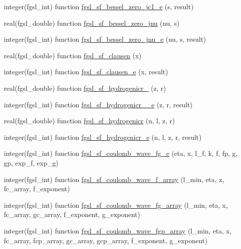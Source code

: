 \begin{DoxyCompactItemize}
\item 
integer(fgsl\+\_\+int) function \hyperlink{specfunc_8finc_a07b02a139009500202e44b443fb68629}{fgsl\+\_\+sf\+\_\+bessel\+\_\+zero\+\_\+jc1\+\_\+e} (s, result)
\item 
real(fgsl\+\_\+double) function \hyperlink{specfunc_8finc_a2b6a51e0fcaa2078253f433e0d39ac1d}{fgsl\+\_\+sf\+\_\+bessel\+\_\+zero\+\_\+jnu} (nu, s)
\item 
integer(fgsl\+\_\+int) function \hyperlink{specfunc_8finc_a4e22b00fa69e7c5052d064ecbba7284e}{fgsl\+\_\+sf\+\_\+bessel\+\_\+zero\+\_\+jnu\+\_\+e} (nu, s, result)
\item 
real(fgsl\+\_\+double) function \hyperlink{specfunc_8finc_a1b58fdfbc073d6678d5337273b140816}{fgsl\+\_\+sf\+\_\+clausen} (x)
\item 
integer(fgsl\+\_\+int) function \hyperlink{specfunc_8finc_a9792a5504136b8a7b5a4d8fae4a4c6de}{fgsl\+\_\+sf\+\_\+clausen\+\_\+e} (x, result)
\item 
real(fgsl\+\_\+double) function \hyperlink{specfunc_8finc_ae6ef61980500abaf485ac9e5029ffcf4}{fgsl\+\_\+sf\+\_\+hydrogenicr\+\_} (z, r)
\item 
integer(fgsl\+\_\+int) function \hyperlink{specfunc_8finc_a1de0cb50a7d57621c2ee852e68de8172}{fgsl\+\_\+sf\+\_\+hydrogenicr\+\_\+\_\+e} (z, r, result)
\item 
real(fgsl\+\_\+double) function \hyperlink{specfunc_8finc_a9cbd481a2f8c7bad674927e1f3307c2d}{fgsl\+\_\+sf\+\_\+hydrogenicr} (n, l, z, r)
\item 
integer(fgsl\+\_\+int) function \hyperlink{specfunc_8finc_aa17737135642df0a246210aa5d83bcf9}{fgsl\+\_\+sf\+\_\+hydrogenicr\+\_\+e} (n, l, z, r, result)
\item 
integer(fgsl\+\_\+int) function \hyperlink{specfunc_8finc_af1f9930ebb769e81b695b20e1b4b232a}{fgsl\+\_\+sf\+\_\+coulomb\+\_\+wave\+\_\+fg\+\_\+e} (eta, x, l\+\_\+f, k, f, fp, g, gp, exp\+\_\+f, exp\+\_\+g)
\item 
integer(fgsl\+\_\+int) function \hyperlink{specfunc_8finc_a6d8df6e51502117d78c30b83f69c3b63}{fgsl\+\_\+sf\+\_\+coulomb\+\_\+wave\+\_\+f\+\_\+array} (l\+\_\+min, eta, x, fc\+\_\+array, f\+\_\+exponent)
\item 
integer(fgsl\+\_\+int) function \hyperlink{specfunc_8finc_a0a43f0adfff211aa448efdc5b432cc9d}{fgsl\+\_\+sf\+\_\+coulomb\+\_\+wave\+\_\+fg\+\_\+array} (l\+\_\+min, eta, x, fc\+\_\+array, gc\+\_\+array, f\+\_\+exponent, g\+\_\+exponent)
\item 
integer(fgsl\+\_\+int) function \hyperlink{specfunc_8finc_aaefd1fac048a2064099bb1197a979856}{fgsl\+\_\+sf\+\_\+coulomb\+\_\+wave\+\_\+fgp\+\_\+array} (l\+\_\+min, eta, x, fc\+\_\+array, fcp\+\_\+array, gc\+\_\+array, gcp\+\_\+array, f\+\_\+exponent, g\+\_\+exponent)

\end{DoxyCompactItemize}
